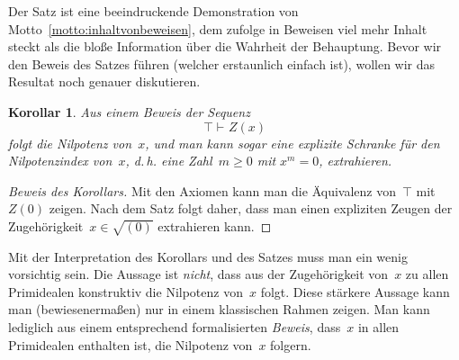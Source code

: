 \documentclass[a4paper,ngerman,12pt]{scrartcl}
\theoremstyle{definition}
\theoremstyle{plain}
\newtheorem{kor}[defn]{Korollar}
\theoremstyle{remark}
\newcommand{\seq}[1]{\mathrel{\vdash\!\!\!_{#1}}}
\renewcommand{\_}{\mathpunct{.}\,}
\newcommand{\?}{\,{:}\,}
\begin{document}
Der Satz ist eine beeindruckende
Demonstration von Motto~\ref{motto:inhaltvonbeweisen}, dem zufolge in
Beweisen viel mehr Inhalt steckt als die bloße Information
über die Wahrheit der Behauptung. Bevor wir den Beweis des Satzes führen (welcher
erstaunlich einfach ist), wollen wir das Resultat noch genauer
diskutieren.

\begin{kor}Aus einem Beweis der Sequenz
\[ \top \seq{} Z(x) \]
folgt die Nilpotenz von~$x$, und man kann sogar eine explizite Schranke
für den Nilpotenzindex von~$x$, d.\,h. eine Zahl~$m \geq 0$ mit $x^m = 0$,
extrahieren.
\end{kor}
\begin{proof}[Beweis des Korollars] Mit den Axiomen kann man die Äquivalenz
von~$\top$ mit~$Z(0)$ zeigen. Nach dem Satz folgt daher, dass man einen
expliziten Zeugen der Zugehörigkeit~$x \in \sqrt{(0)}$ extrahieren
kann.\end{proof}

Mit der Interpretation des Korollars und des Satzes muss man ein wenig
vorsichtig sein. Die Aussage ist \emph{nicht}, dass aus der Zugehörigkeit
von~$x$ zu allen Primidealen konstruktiv die Nilpotenz von~$x$ folgt. Diese stärkere
Aussage kann man (bewiesenermaßen) nur in einem klassischen Rahmen zeigen.
Man kann lediglich aus einem entsprechend formalisierten
\emph{Beweis}, dass~$x$ in allen Primidealen enthalten ist, die Nilpotenz
von~$x$ folgern.
\end{document}

